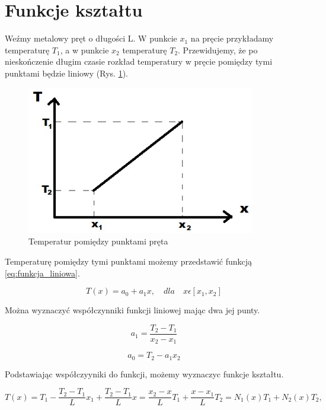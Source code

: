 
\section{Funkcje kształtu}
\label{sec:funkcje_ksztaltu}

Weźmy metalowy pręt o długości L. W punkcie \(x_1\) na pręcie przykładamy temperaturę \( T_1 \), a w punkcie \(x_2\) temperaturę \( T_2 \). Przewidujemy, że po nieskończenie długim czasie rozkład temperatury w pręcie pomiędzy tymi punktami będzie liniowy (Rys. \ref{fig:temperatura_pret}).

\begin{figure}[h]
\centering
\includegraphics[width=10cm]{Zdjecia/3/rozklad_temperatury}
\caption{Temperatur pomiędzy punktami pręta}
\label{fig:temperatura_pret}
\end{figure}

Temperaturę pomiędzy tymi punktami możemy przedstawić funkcją \ref{eq:funkcja_liniowa}.

\begin{equation} \label{eq:funkcja_liniowa}
T(x)=a_0 + a_1 x, \quad dla \quad x \epsilon [x_1, x_2]
\end{equation}

Można wyznaczyć współczynniki funkcji liniowej mając dwa jej punty.

\begin{equation}
a_1 = \frac{T_2 - T_1}{x_2 - x_1}
\end{equation}

\begin{equation}
a_0 = T_2 - a_1 x_2
\end{equation}

Podstawiając współczyyniki do funkcji, możemy wyznaczyc funkcje kształtu.

\begin{equation}
T(x) = T_1 - \frac{T_2 - T_1}{L} x_1 + \frac{T_2 - T_1}{L} x = \frac{x_2 - x}{L}T_1 + \frac{x - x_1}{L}T_2 = N_1(x)T_1 + N_2(x)T_2,
\end{equation}

